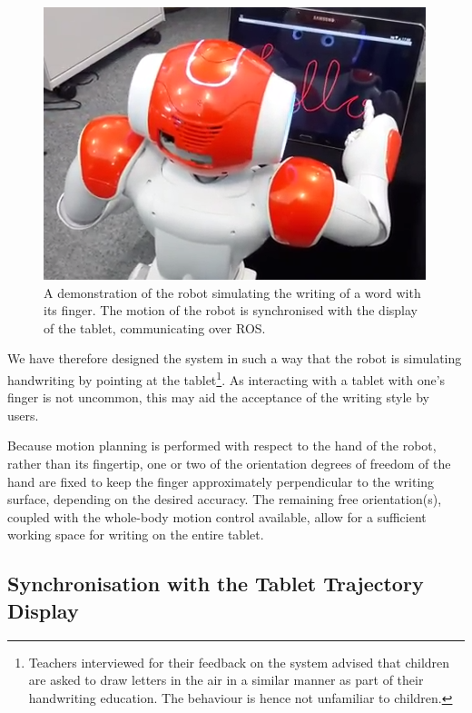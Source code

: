 \documentclass{sig-alternate}
\begin{document}
\begin{figure}[thpb]
     \begin{center}
            \includegraphics[width=0.7\linewidth]{figures/naoWriting2.png}
    \end{center}
    \caption{A demonstration of the robot simulating the writing of a word with
    its finger. The motion of the robot is synchronised with the display of the
    tablet, communicating over ROS.\protect\footnotemark}%

   \label{fig:naoWriting}
\end{figure}

We have therefore designed the system in such a way that the robot is
simulating handwriting by pointing at the tablet\footnote{Teachers interviewed
for their feedback on the system advised that children are asked to draw letters
in the air in a similar manner as part of their handwriting education. The behaviour 
is hence not unfamiliar to children.}. As
interacting with a tablet with one's finger is not uncommon, this may aid the
acceptance of the writing style by users. 

Because
motion planning is performed with respect to the hand of the robot, rather than
its fingertip, one or two of the orientation degrees of freedom of the hand
are fixed to keep the finger approximately perpendicular to the writing surface,
depending on the desired accuracy. The remaining free orientation(s), coupled
with the whole-body motion control available, allow for a sufficient working
space for writing on the entire tablet.

\subsection{Synchronisation with the Tablet Trajectory Display}\label{sec:tabletSynch}
\end{document}
